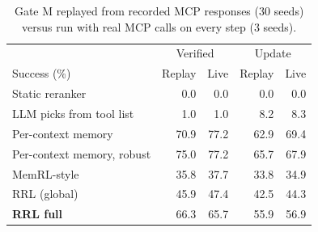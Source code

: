 \begin{table}[t]
\centering
\small
\begin{tabular}{lrrrr}
\toprule
 & \multicolumn{2}{c}{Verified} & \multicolumn{2}{c}{Update} \\
Success (\%) & Replay & Live & Replay & Live \\
\midrule
Static reranker & 0.0 & 0.0 & 0.0 & 0.0 \\
LLM picks from tool list & 1.0 & 1.0 & 8.2 & 8.3 \\
Per-context memory & 70.9 & 77.2 & 62.9 & 69.4 \\
Per-context memory, robust & 75.0 & 77.2 & 65.7 & 67.9 \\
MemRL-style & 35.8 & 37.7 & 33.8 & 34.9 \\
RRL (global) & 45.9 & 47.4 & 42.5 & 44.3 \\
\textbf{RRL full} & 66.3 & 65.7 & 55.9 & 56.9 \\
\bottomrule
\end{tabular}
\caption{Gate M replayed from recorded MCP responses (30 seeds) versus run with real MCP calls on
every step (3 seeds).}
\label{tab:live}
\end{table}
